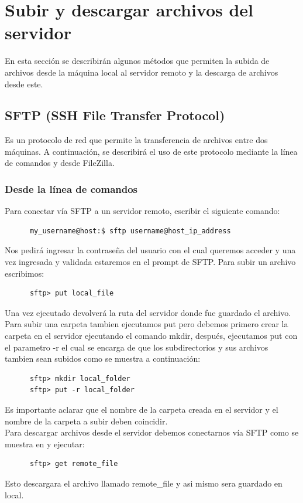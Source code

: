 \documentclass[12pt]{article}
\begin{document}
\section{Subir y descargar archivos del servidor}
En esta secci\'on se describir\'an algunos m\'etodos que permiten la subida de archivos desde
la m\'aquina local al servidor remoto y la descarga de archivos desde este.
\subsection{SFTP (SSH File Transfer Protocol)}
Es un protocolo de red que permite la transferencia de archivos entre dos m\'aquinas. A continuaci\'on, se describir\'a el uso de este protocolo mediante la l\'inea de comandos y desde FileZilla.
\subsubsection{Desde la l\'inea de comandos}
Para conectar v\'ia SFTP a un servidor remoto, escribir el siguiente comando:
\begin{verbatim}
      my_username@host:$ sftp username@host_ip_address
\end{verbatim}
Nos pedir\'a ingresar la contrase\~na del usuario con el cual queremos acceder y
una vez ingresada y validada estaremos en el prompt de SFTP.
Para subir un archivo escribimos:
\begin{verbatim}
      sftp> put local_file
\end{verbatim}
Una vez ejecutado devolver\'a la ruta del servidor donde fue guardado el archivo.\\
Para subir una carpeta tambien ejecutamos put pero debemos primero crear la carpeta en el servidor ejecutando el comando mkdir, despu\'es, ejecutamos put con el parametro -r el cual se encarga de que los subdirectorios y sus archivos tambien sean subidos como se muestra a continuaci\'on:
\begin{verbatim}
      sftp> mkdir local_folder
      sftp> put -r local_folder
\end{verbatim}
Es importante aclarar que el nombre de la carpeta creada 
en el servidor y el nombre de la carpeta a subir deben coincidir.\\
Para descargar archivos desde el servidor debemos conectarnos v\'ia 
SFTP como se muestra en y ejecutar:
\begin{verbatim}
      sftp> get remote_file
\end{verbatim}
Esto descargara el archivo llamado remote\_file y asi mismo sera guardado en local.
\end{document}
